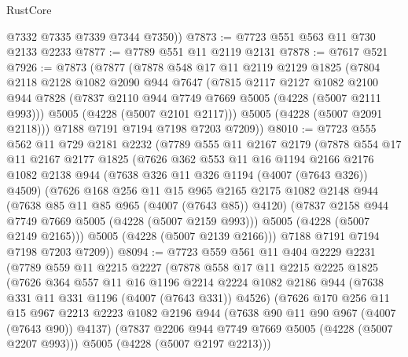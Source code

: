 \begin{lexlean}{RustCore}
\begin{coremodule}
        @7332
        @7335
        @7339
        @7344
        @7350))
@7873 := @7723 @551 @563 @11 @730 @2133 @2233
@7877 := @7789 @551 @11 @2119 @2131
@7878 := @7617 @521
@7926 := @7873
    (@7877
      (@7878
        @548
        @17
        @11
        @2119
        @2129
        @1825
        (@7804
          @2118
          @2128
          @1082
          @2090
          @944
          @7647
          (@7815
            @2117
            @2127
            @1082
            @2100
            @944
            @7828
            (@7837 @2110 @944 @7749 @7669 @5005 (@4228 (@5007 @2111 @993)))
            @5005
            (@4228 (@5007 @2101 @2117)))
          @5005
          (@4228 (@5007 @2091 @2118)))
        @7188
        @7191
        @7194
        @7198
        @7203
        @7209))
@8010 := @7723
    @555
    @562
    @11
    @729
    @2181
    @2232
    (@7789
      @555
      @11
      @2167
      @2179
      (@7878
        @554
        @17
        @11
        @2167
        @2177
        @1825
        (@7626
          @362
          @553
          @11
          @16
          @1194
          @2166
          @2176
          @1082
          @2138
          @944
          (@7638 @326 @11 @326 @1194 (@4007 (@7643 @326)) @4509)
          (@7626
            @168
            @256
            @11
            @15
            @965
            @2165
            @2175
            @1082
            @2148
            @944
            (@7638 @85 @11 @85 @965 (@4007 (@7643 @85)) @4120)
            (@7837 @2158 @944 @7749 @7669 @5005 (@4228 (@5007 @2159 @993)))
            @5005
            (@4228 (@5007 @2149 @2165)))
          @5005
          (@4228 (@5007 @2139 @2166)))
        @7188
        @7191
        @7194
        @7198
        @7203
        @7209))
@8094 := @7723
    @559
    @561
    @11
    @404
    @2229
    @2231
    (@7789
      @559
      @11
      @2215
      @2227
      (@7878
        @558
        @17
        @11
        @2215
        @2225
        @1825
        (@7626
          @364
          @557
          @11
          @16
          @1196
          @2214
          @2224
          @1082
          @2186
          @944
          (@7638 @331 @11 @331 @1196 (@4007 (@7643 @331)) @4526)
          (@7626
            @170
            @256
            @11
            @15
            @967
            @2213
            @2223
            @1082
            @2196
            @944
            (@7638 @90 @11 @90 @967 (@4007 (@7643 @90)) @4137)
            (@7837 @2206 @944 @7749 @7669 @5005 (@4228 (@5007 @2207 @993)))
            @5005
            (@4228 (@5007 @2197 @2213)))

\end{coremodule}
\end{lexlean}
